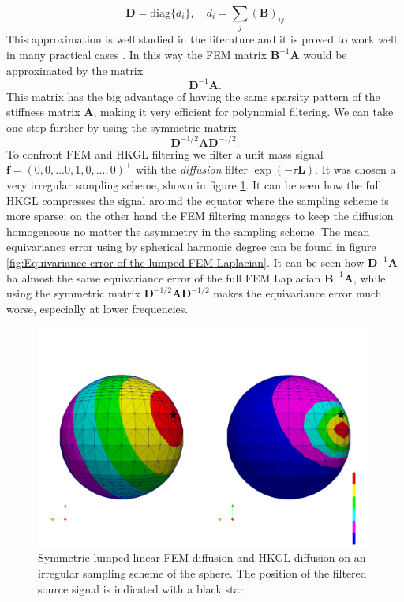 \begin{equation}\label{eq:lumping}
\mathbf D = \text{diag}\{d_i\},\quad d_i = \sum_j (\mathbf B)_{ij}
\end{equation}
This approximation is well studied in the literature and it is proved to work well in many practical cases \cite{Quarteroni:1639539}. In this way the FEM matrix $\mathbf B^{-1}\mathbf A$ would be approximated by the matrix
$$
\mathbf D^{-1}\mathbf A.
$$
This matrix has the big advantage of having the same sparsity pattern of the stiffness matrix $\mathbf A$, making it very efficient for polynomial filtering. We can take one step further by using the symmetric matrix
$$
\mathbf D^{-1/2}\mathbf A\mathbf D^{-1/2}.
$$
To confront FEM and HKGL filtering we filter a unit mass signal \\$\mathbf{f}=(0,0,...0,1,0,...,0)^\intercal$ with the \textit{diffusion} filter $\exp{(-\tau \mathbf L)}$. It was chosen a very irregular sampling scheme, shown in figure \ref{fig:FEM lumped symmetric diffusion on irregular sampling}. It can be seen how the full HKGL compresses the signal around the equator where the sampling scheme is more sparse; on the other hand the FEM filtering manages to keep the diffusion homogeneous no matter the asymmetry in the sampling scheme. 
The mean equivariance error using by spherical harmonic degree can be found in figure \ref{fig:Equivariance error of the lumped FEM Laplacian}. It can be seen how $\mathbf D^{-1}\mathbf A$ ha almost the same equivariance error of the full FEM Laplacian $\mathbf B^{-1}\mathbf A$, while using the symmetric matrix $\mathbf D^{-1/2}\mathbf A \mathbf D^{-1/2}$ makes the equivariance error much worse, especially at lower frequencies.
\clearpage
\begin{figure}[h!]
	\centering
	\includegraphics[width=\textwidth]{figs/Chapter3/diffusion.png}
	\caption{\label{fig:FEM lumped symmetric diffusion on irregular sampling}Symmetric lumped linear FEM diffusion and HKGL diffusion on an irregular sampling scheme of the sphere. The position of the filtered source signal is indicated with a black star.}
\end{figure}
